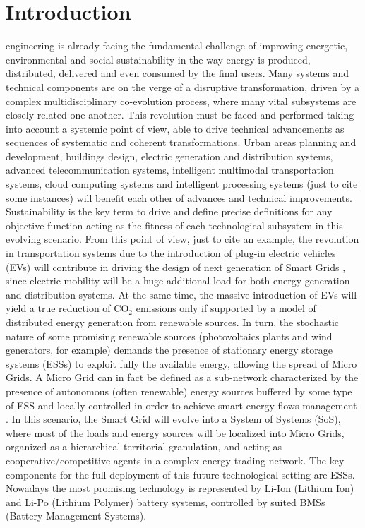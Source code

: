 \documentclass[journal]{IEEEtran}
\begin{document}
\section{Introduction}
\label{sec:intro}
 engineering is already facing the fundamental challenge of improving energetic, environmental and social sustainability in the way energy is produced, distributed, delivered and even consumed by the final users. Many systems and technical components are on the verge of a disruptive transformation, driven by a complex multidisciplinary co-evolution process, where many vital subsystems are closely related one another. This revolution must be faced and performed taking into account a systemic point of view, able to drive technical advancements as sequences of systematic and coherent transformations. Urban areas planning and development, buildings design, electric generation and distribution systems, advanced telecommunication systems, intelligent multimodal transportation systems, cloud computing systems and intelligent processing systems  (just to cite some instances) will benefit each other of advances and technical improvements. Sustainability is the key term to drive and define precise definitions for any objective function acting as the fitness of each technological subsystem in this evolving scenario. 
From this point of view, just to cite an example, the revolution in transportation systems due to the introduction of plug-in electric vehicles (EVs) will contribute in driving the design of next generation of Smart Grids \cite{Yu_2011,deSantis_2015,Storti_2015}, since electric mobility will be a huge additional load for both energy generation and distribution systems. At the same time, the massive introduction of EVs will yield a true reduction of $\mathrm{CO_2}$ emissions only if supported by a model of distributed energy generation from renewable sources. In turn, the stochastic nature of some promising renewable sources (photovoltaics plants and wind generators, for example) demands the presence of stationary energy storage systems (ESSs) to exploit fully the available energy, allowing the spread of Micro Grids. A Micro Grid can in fact be defined as a sub-network characterized by the presence of autonomous (often renewable) energy sources buffered by some type of ESS and locally controlled in order to achieve smart energy flows management \cite{deSantis_2013}. In this scenario, the Smart Grid will evolve into a System of Systems (SoS), where most of the loads and energy sources will be localized into Micro Grids, organized as a hierarchical territorial granulation, and acting as cooperative/competitive agents in a complex energy trading network. The key components for the full deployment of this future technological setting are ESSs. Nowadays the most promising technology is represented by Li-Ion (Lithium Ion) and Li-Po (Lithium Polymer) battery systems, controlled by suited BMSs (Battery Management Systems).
\end{document}
